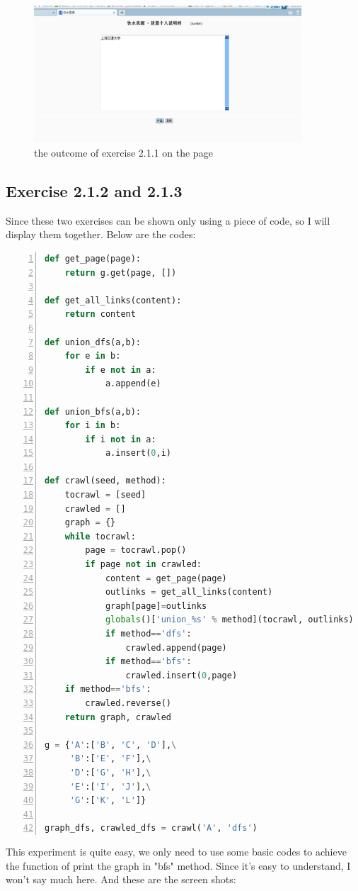 \documentclass{article}
\begin{document}
\begin{figure}[htbp]
\centering
\includegraphics[width=10cm]{8.png}
\caption{the outcome of exercise 2.1.1 on the page}
\end{figure}
\subsection{Exercise 2.1.2 and 2.1.3}
Since these two exercises can be shown only using a piece of code, so I will display them together. Below are the codes:\\
\begin{lstlisting}[language=python,numbers=left,frame=leftline]
def get_page(page):
    return g.get(page, [])

def get_all_links(content):
    return content

def union_dfs(a,b):
    for e in b:
        if e not in a:
            a.append(e)

def union_bfs(a,b):
    for i in b:
        if i not in a:
            a.insert(0,i)

def crawl(seed, method):
    tocrawl = [seed]
    crawled = []
    graph = {}
    while tocrawl:
        page = tocrawl.pop()
        if page not in crawled:
            content = get_page(page)
            outlinks = get_all_links(content)
            graph[page]=outlinks
            globals()['union_%s' % method](tocrawl, outlinks)
            if method=='dfs':
                crawled.append(page)
            if method=='bfs':
                crawled.insert(0,page)
    if method=='bfs':
        crawled.reverse()
    return graph, crawled

g = {'A':['B', 'C', 'D'],\
     'B':['E', 'F'],\
     'D':['G', 'H'],\
     'E':['I', 'J'],\
     'G':['K', 'L']}

graph_dfs, crawled_dfs = crawl('A', 'dfs')
\end{lstlisting}
This experiment is quite easy, we only need to use some basic codes to achieve the function of print the graph in "bfs" method. Since it's easy to understand, I won't say much here. And these are the screen shots:\\
\end{document}
